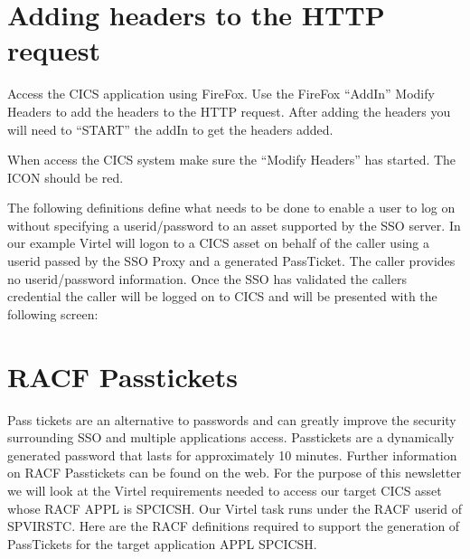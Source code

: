 \documentclass[letterpaper,10pt,english]{sphinxmanual}
\begin{document}
\section{Adding headers to the HTTP request}
\label{\detokenize{connectivity_guide:adding-headers-to-the-http-request}}\label{\detokenize{connectivity_guide:index-170}}
\sphinxAtStartPar
Access the CICS application using FireFox. Use the FireFox “AddIn” Modify Headers to add the headers to the HTTP request. After adding the headers you will need to “START” the addIn to get the headers added.

\sphinxAtStartPar
{} 

\sphinxAtStartPar
When access the CICS system make sure the “Modify Headers” has started. The ICON should be red.

\sphinxAtStartPar
{}

\sphinxAtStartPar
{}

\sphinxAtStartPar
The following definitions define what needs to be done to enable a user to log on without specifying a userid/password to an asset supported by the SSO server. In our example Virtel will logon to a CICS asset on behalf of the caller using a userid passed by the SSO Proxy and a generated PassTicket. The caller provides no userid/password information. Once the SSO has validated the callers credential the caller will be logged on to CICS and will be presented with the following screen:\sphinxhyphen{}

\sphinxAtStartPar
{} 

\newpage

\ignorespaces 

\section{RACF Passtickets}
\label{\detokenize{connectivity_guide:racf-passtickets}}\label{\detokenize{connectivity_guide:index-171}}
\sphinxAtStartPar
Pass tickets are an alternative to passwords and can greatly improve the security surrounding SSO and multiple applications access. Passtickets are a dynamically generated password that lasts for approximately 10 minutes. Further information on RACF Passtickets can be found on the web. For the purpose of this newsletter we will look at the Virtel requirements needed to access our target CICS asset whose RACF APPL is SPCICSH. Our Virtel task runs under the RACF userid of SPVIRSTC. Here are the RACF definitions required to support the generation of PassTickets for the target application APPL SPCICSH.
\end{document}
